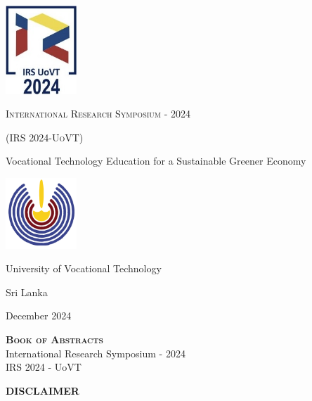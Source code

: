 \documentclass[b5paper,10pt]{article}
\begin{document}
\begin{titlepage}
    \centering
    \includegraphics[width=0.2\textwidth]{Images/Logo.jpeg}\par\vspace{1.5cm}
    {\scshape\LARGE International Research Symposium - 2024 \par}
    {\scshape\Large (IRS 2024-UoVT)\par}
    \vspace{2.5cm}
    {\huge  Vocational Technology Education for a Sustainable Greener Economy \par}
    \vspace{2cm}
    \includegraphics[width=0.2\textwidth]{Images/Unilogo.png}\\
    \vspace{2.5cm}
    {\Large University of Vocational Technology\par}
    {\Large Sri Lanka\par}
    \vfill
    {\large December 2024\par}

\end{titlepage}
\restoregeometry
\setcounter{page}{1}


\vspace*{1cm}
\begin{center}
    \LARGE{\textsc{\textbf{Book of Abstracts}}}\\ \vspace{1cm}
    \Large{International Research Symposium - 2024}\\ \vspace{0.5cm}
    IRS 2024 - UoVT
\end{center}
\vspace{1cm}
\textbf{DISCLAIMER}\\ 
\end{document}
